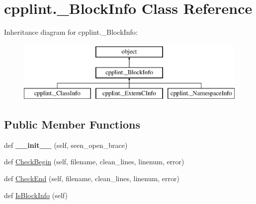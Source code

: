 \hypertarget{classcpplint_1_1__BlockInfo}{}\section{cpplint.\+\_\+\+Block\+Info Class Reference}
\label{classcpplint_1_1__BlockInfo}
Inheritance diagram for cpplint.\+\_\+\+Block\+Info\+:\begin{figure}[H]
\begin{center}
\leavevmode
\includegraphics[height=3.000000cm]{classcpplint_1_1__BlockInfo}
\end{center}
\end{figure}
\subsection*{Public Member Functions}
\begin{DoxyCompactItemize}
\item 
def {\bfseries \+\_\+\+\_\+init\+\_\+\+\_\+} (self, seen\+\_\+open\+\_\+brace)\hypertarget{classcpplint_1_1__BlockInfo_aeb3be53b1a456b9ea4f7cc6e15b4b14e}{}\label{classcpplint_1_1__BlockInfo_aeb3be53b1a456b9ea4f7cc6e15b4b14e}

\item 
def \hyperlink{classcpplint_1_1__BlockInfo_af316a9e3623b45bd07079166be67582c}{Check\+Begin} (self, filename, clean\+\_\+lines, linenum, error)
\item 
def \hyperlink{classcpplint_1_1__BlockInfo_ae504a3429de136eebf85f32fcae6a8ca}{Check\+End} (self, filename, clean\+\_\+lines, linenum, error)
\item 
def \hyperlink{classcpplint_1_1__BlockInfo_ab3e06a94a38d7397ce6a4faa094010d4}{Is\+Block\+Info} (self)
\end{DoxyCompactItemize}
